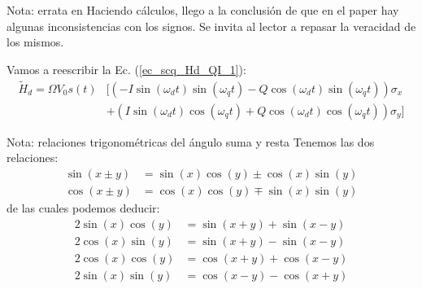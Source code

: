         
        \begin{mybox_blue}{Nota: errata en \cite{bib_A_quantum_engineers_guide}}
        Haciendo cálculos, llego a la conclusión de que en el paper \cite{bib_A_quantum_engineers_guide} hay algunas inconsistencias con los signos. Se invita al lector a repasar la veracidad de los mismos.
        \end{mybox_blue}
        
        Vamos a reescribir la Ec. (\ref{ec_scq_Hd_QI_1}):
        \begin{equation} \label{ec_scq_Hd_QI_2}
            \begin{aligned}
                \tilde{H}_d  =  \Omega V_0 s(t) & [ (- I \sin (\omega_d t)\sin(\omega_qt)  - Q \cos (\omega_d t)\sin(\omega_qt))   \sigma_x\\
                & +  (I \sin (\omega_d t)\cos (\omega_q t) + Q \cos (\omega_d t)\cos (\omega_q t) ) \sigma_y ]
            \end{aligned}
        \end{equation}
        
        \begin{mybox_blue}{Nota: relaciones trigonométricas del ángulo suma y resta}
        Tenemos las dos relaciones:
        \begin{equation} 
            \begin{aligned}
                \sin(x\pm y) &= \sin(x)\cos(y) \pm \cos(x)\sin(y) \\
                \cos(x \pm y) &= \cos(x) \cos(y) \mp \sin(x) \sin(y) 
            \end{aligned}
        \end{equation}
        de las cuales podemos deducir:
        \begin{equation} \label{ec_scq_relaciones_trig}
            \begin{aligned} 
                2 \sin(x)\cos(y) &= \sin(x + y) + \sin(x - y) \\
                2 \cos(x)\sin(y) &= \sin(x + y) - \sin(x - y) \\
                2 \cos(x)\cos(y) &= \cos(x + y) + \cos(x - y) \\
                2 \sin(x)\sin(y) &= \cos(x - y) - \cos(x + y) 
            \end{aligned}
        \end{equation}
        \end{mybox_blue}
        
